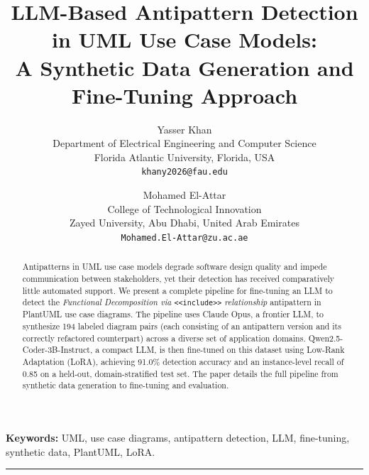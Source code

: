 \documentclass[12pt, a4paper]{article}
\begin{document}
\title{%
  \textbf{LLM-Based Antipattern Detection in UML Use Case Models:\\[4pt]
  A Synthetic Data Generation and Fine-Tuning Approach}
}
\author{%
  Yasser Khan\\
  \small Department of Electrical Engineering and Computer Science\\
  \small Florida Atlantic University, Florida, USA\\
  \small \texttt{khany2026@fau.edu}
  \and
  Mohamed El-Attar\\
  \small College of Technological Innovation\\
  \small Zayed University, Abu Dhabi, United Arab Emirates\\
  \small \texttt{Mohamed.El-Attar@zu.ac.ae}
}
\date{}
\maketitle
\thispagestyle{fancy}

\begin{abstract}
Antipatterns in UML use case models degrade software design quality and
impede communication between stakeholders, yet their detection has received
comparatively little automated support.  We present a complete pipeline for
fine-tuning an LLM to detect the \emph{Functional Decomposition
via} \texttt{<<include>>} \emph{relationship} antipattern in PlantUML use
case diagrams.  The pipeline uses Claude Opus, a frontier LLM,
to synthesize 194 labeled diagram pairs (each consisting of an antipattern
version and its correctly refactored counterpart) across a diverse set of
application domains.  Qwen2.5-Coder-3B-Instruct, a compact LLM, is then
fine-tuned on this dataset using Low-Rank Adaptation (LoRA), achieving
91.0\% detection accuracy and an instance-level recall of 0.85 on a held-out, domain-stratified test set.  The paper details the full pipeline from synthetic data generation to fine-tuning and evaluation.
\end{abstract}

\noindent\textbf{Keywords:} UML, use case diagrams, antipattern detection,
LLM, fine-tuning, synthetic data, PlantUML, LoRA.

\vspace{1em}
\hrule
\vspace{1em}

\end{document}
